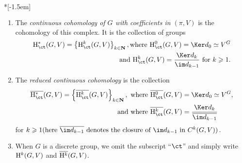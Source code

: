 \goodbreak
\begin{defi}\label{ell_pcont_def}\ \\*[-1.5em]
\begin{enumerate}
\item The \emph{continuous cohomology of $G$ with coefficients in $(\pi,V)$} is the cohomology of this complex. It is the collection of groups 
\begin{align*}
{\rm H}_{\ct}^* (G, V) = \left\{{\rm H}_{\ct}^k (G, V)\right\}_{k \in {\bf N}}, \text{where }{\rm H}_{\ct} ^0 (G, V)
= \Ker d_0 \simeq V^G\\
\text{ and }{\rm H}_{\ct}^k (G, V) = \frac{\Ker d_k}{\im d_{k-1}}\text{ for }k \geqslant 1.
\end{align*}
\item The \emph{reduced continuous cohomology} is the collection 
\begin{align*}
\overline{{\rm H}_{\ct}^*} (G, V) =
\left\{\overline{{\rm H}_{\ct}^k} (G, V) \right\}_{k \in {\bf N}}, \text{ where }\overline{{\rm H}_{\ct} ^0} (G, V) &= \Ker d_0 \simeq V^G,\\ 
\text{ and where }\overline{{\rm H}_{\ct}^k} (G, V) &=  \frac{\phantom{\mkern5mu}\Ker d_k\phantom{\mkern5mu}}{\overline{\im d_{k-1}}}
\end{align*}
for $k \geqslant 1 (\text{here }\overline{\im d_{k-1}}\text{ denotes the closure of } \im d_{k-1}\text{ in }C^k (G,V))\,.$
\item When $G$ is a discrete group, we omit the subscript ``$\ct$'' and simply write ${\rm H}^k (G, V)$ and $\overline{{\rm H}^k} (G, V)$.
\end{enumerate}
\end{defi}

